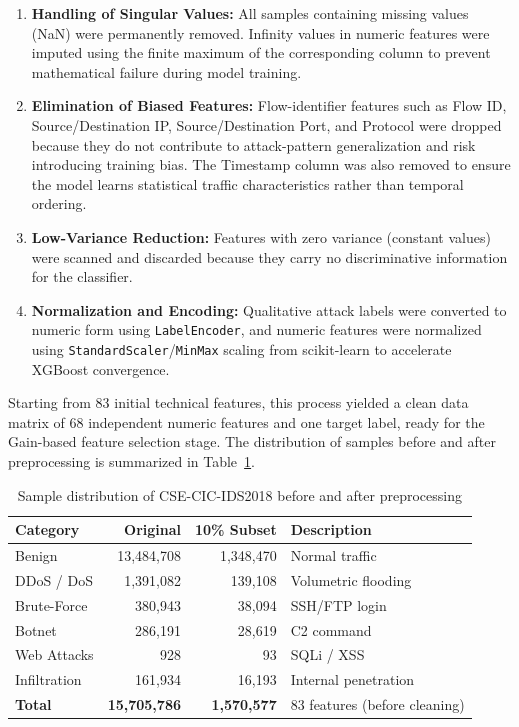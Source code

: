 \documentclass[11pt, a4paper]{article}
\begin{document}
\begin{enumerate}
    \item \textbf{Handling of Singular Values:} All samples containing missing values (NaN) were permanently removed. Infinity values in numeric features were imputed using the finite maximum of the corresponding column to prevent mathematical failure during model training.
    \item \textbf{Elimination of Biased Features:} Flow-identifier features such as Flow ID, Source/Destination IP, Source/Destination Port, and Protocol were dropped because they do not contribute to attack-pattern generalization and risk introducing training bias. The Timestamp column was also removed to ensure the model learns statistical traffic characteristics rather than temporal ordering.
    \item \textbf{Low-Variance Reduction:} Features with zero variance (constant values) were scanned and discarded because they carry no discriminative information for the classifier.
    \item \textbf{Normalization and Encoding:} Qualitative attack labels were converted to numeric form using \texttt{LabelEncoder}, and numeric features were normalized using \texttt{StandardScaler}/\texttt{MinMax} scaling from scikit-learn \citep{ref_sklearn} to accelerate XGBoost convergence.
\end{enumerate}

Starting from 83 initial technical features, this process yielded a clean data matrix of 68 independent numeric features and one target label, ready for the Gain-based feature selection stage. The distribution of samples before and after preprocessing is summarized in Table~\ref{tab:distribution}.

\begin{table}[H]
\caption{Sample distribution of CSE-CIC-IDS2018 before and after preprocessing}
\label{tab:distribution}
\centering
\small
\begin{tabular}{@{} l r r l @{}}
\toprule
\textbf{Category} & \textbf{Original} & \textbf{10\% Subset} & \textbf{Description} \\ \midrule
Benign        & 13{,}484{,}708 & 1{,}348{,}470 & Normal traffic \\
DDoS / DoS    & 1{,}391{,}082  & 139{,}108     & Volumetric flooding \\
Brute-Force   & 380{,}943      & 38{,}094      & SSH/FTP login \\
Botnet        & 286{,}191      & 28{,}619      & C2 command \\
Web Attacks   & 928           & 93           & SQLi / XSS \\
Infiltration  & 161{,}934      & 16{,}193      & Internal penetration \\ \midrule
\textbf{Total} & \textbf{15{,}705{,}786} & \textbf{1{,}570{,}577} & 83 features (before cleaning) \\ \bottomrule
\end{tabular}
\end{table}
\end{document}
